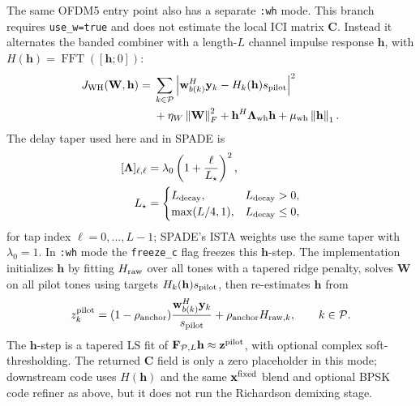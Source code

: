 \documentclass[journal]{IEEEtran}
\newcommand{\norm}[1]{\left\lVert #1 \right\rVert}
\newcommand{\abs}[1]{\left\lvert #1 \right\rvert}
\begin{document}
The same OFDM5 entry point also has a separate \texttt{:wh} mode. This branch
requires \texttt{use\_w=true} and does not estimate the local ICI matrix
\(\mathbf C\). Instead it alternates the banded combiner with a length-\(L\)
channel impulse response \(\mathbf h\), with
\(H(\mathbf h)=\operatorname{FFT}([\mathbf h;0])\):
\begin{equation}
\begin{aligned}
  J_{\rm WH}(\mathbf W,\mathbf h)
  ={}&\sum_{k\in\mathcal P}
    \abs{\mathbf w_{b(k)}^H\mathbf y_k-H_k(\mathbf h)s_{\rm pilot}}^2\\
  &+\eta_W\norm{\mathbf W}_F^2
    +\mathbf h^H\boldsymbol\Lambda_{\rm wh}\mathbf h
    +\mu_{\rm wh}\norm{\mathbf h}_1 .
\end{aligned}
  \label{eq:ofdm5-wh-loss}
\end{equation}
The delay taper used here and in SPADE is
\begin{equation}
\begin{aligned}
  [\boldsymbol\Lambda]_{\ell,\ell}
  &=\lambda_0\left(1+\frac{\ell}{L_\star}\right)^2,\\
  L_\star&=
  \begin{cases}
    L_{\rm decay}, & L_{\rm decay}>0,\\
    \max(L/4,1), & L_{\rm decay}\le0,
  \end{cases}
\end{aligned}
  \label{eq:ofdm5-delay-taper}
\end{equation}
for tap index \(\ell=0,\ldots,L-1\); SPADE's ISTA weights use the same taper
with \(\lambda_0=1\). In \texttt{:wh} mode the \texttt{freeze\_c} flag freezes
this \(\mathbf h\)-step.
The implementation initializes \(\mathbf h\) by fitting \(H_{\rm raw}\) over all
tones with a tapered ridge penalty, solves \(\mathbf W\) on all pilot tones using
targets \(H_k(\mathbf h)s_{\rm pilot}\), then re-estimates \(\mathbf h\) from
\begin{equation}
  z^{\rm pilot}_k
  =(1-\rho_{\rm anchor})
    \frac{\mathbf w_{b(k)}^H\mathbf y_k}{s_{\rm pilot}}
    +\rho_{\rm anchor}H_{{\rm raw},k},\qquad k\in\mathcal P .
\label{eq:ofdm5-wh-zpilot}
\end{equation}
The \(\mathbf h\)-step is a tapered LS fit of
\(\mathbf F_{\mathcal P,L}\mathbf h\approx \mathbf z^{\rm pilot}\), with optional
complex soft-thresholding. The returned \(\mathbf C\) field is only a zero
placeholder in this mode; downstream code uses \(H(\mathbf h)\) and the same
\(\mathbf x^{\rm fixed}\) blend and optional BPSK code refiner as above, but it
does not run the Richardson demixing stage.
\end{document}
